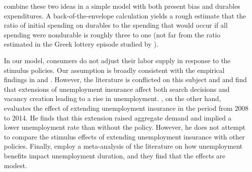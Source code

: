 \documentclass[\econtexRoot/HAFiscal]{subfiles}
\begin{document}
\cite{laibson2022simple} combine these two ideas in a simple model with both present bias and durables expenditures.  A back-of-the-envelope calculation yields a rough estimate that the ratio of initial spending on durables to the spending that would occur if all spending were nondurable is roughly three to one (not far from the ratio estimated in the Greek lottery episode studied by \cite{kotsogiannisMPCs}).

In our model, consumers do not adjust their labor supply in response to the stimulus policies.  Our assumption is broadly consistent with the empirical findings in \cite{ganong2022spending} and \cite{chodorow2016limited}. However, the literature is conflicted on this subject and \cite{hagedorn2017impact} and \cite{hagedorn2019unemployment} find that extensions of unemployment insurance affect both search decisions and vacancy creation leading to a rise in unemployment. \cite{kekre2022unemp}, on the other hand, evaluates the effect of extending unemployment insurance in the period from 2008 to 2014. He finds that this extension raised aggregate demand and implied a lower unemployment rate than without the policy. However, he does not attempt to compare the stimulus effects of extending unemployment insurance with other policies. Finally, \cite{cohen2025disemployment} employ a meta-analysis of the literature on how unemployment benefits impact unemployment duration, and they find that the effects are modest. 
\end{document}
